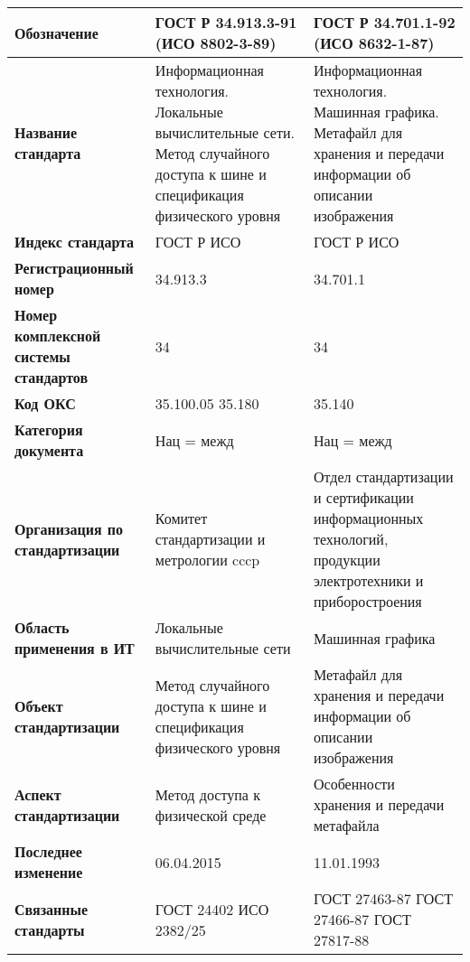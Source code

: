 \begin{table}[h!tp]
	\centering
	\caption{}
	\label{table:national:international}
	\begin{tabular}{|p{10em}|p{12em}|p{12em}|}
		\hline
		\textbf{Обозначение}
			& \textbf{ГОСТ Р 34.913.3-91 (ИСО 8802-3-89)}
			& \textbf{ГОСТ Р 34.701.1-92 (ИСО 8632-1-87)} \\ \hline
		\textbf{Название стандарта}
			& Информационная технология. Локальные вычислительные сети. Метод случайного доступа к шине и спецификация физического уровня
			& Информационная технология. Машинная графика. Метафайл для хранения и передачи информации об описании изображения \\ \hline
		\textbf{Индекс стандарта}
			& ГОСТ Р ИСО & ГОСТ Р ИСО \\ \hline
		\textbf{Регистрационный номер}
			& 34.913.3 & 34.701.1 \\ \hline
		\textbf{Номер комплексной системы стандартов}
			& 34 & 34 \\ \hline
		\textbf{Код ОКС}
			& 35.100.05 35.180 & 35.140 \\ \hline
		\textbf{Категория документа}
			& Нац = межд & Нац = межд \\ \hline
		\textbf{Организация по стандартизации}
			& Комитет стандартизации и метрологии cccp
			& Отдел стандартизации и сертификации информационных технологий, продукции электротехники и приборостроения \\ \hline
		\textbf{Область применения в ИТ}
			& Локальные вычислительные сети
			& Машинная графика \\ \hline
		\textbf{Объект стандартизации}
			& Метод случайного доступа к шине и спецификация физического уровня
			& Метафайл для хранения и передачи информации об описании изображения \\ \hline
		\textbf{Аспект стандартизации}
			& Метод доступа к физической среде
			& Особенности хранения и передачи метафайла \\ \hline
		\textbf{Последнее изменение}
			& 06.04.2015 & 11.01.1993 \\ \hline
		\textbf{Связанные стандарты}
			& ГОСТ 24402 ИСО 2382/25
            & ГОСТ 27463-87 ГОСТ 27466-87 ГОСТ 27817-88 \\ \hline
	\end{tabular}
\end{table}

